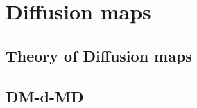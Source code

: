 \chapter{Diffusion maps}
\label{ch:diffusion}
\section{Theory of Diffusion maps}
\section{DM-d-MD}



